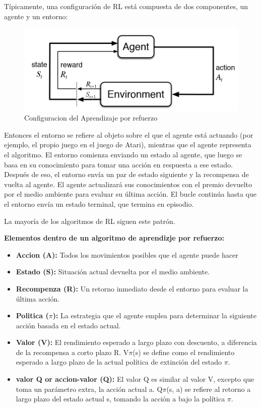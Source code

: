 Típicamente, una configuración de RL está compuesta de dos componentes, un agente y un entorno:

\begin{figure}[ht]
	\centering
	\includegraphics[width=0.30\linewidth]{figuras/reinforcementLearning.png}
	\caption{Configuracion del Aprendizaje por refuerzo}
	\label{ASS}
\end{figure}


Entonces el entorno se refiere al objeto sobre el que el agente está actuando (por ejemplo, el propio juego en el juego de Atari), mientras que el agente representa el algoritmo. El entorno comienza enviando un estado al agente, que luego se basa en su conocimiento para tomar una acción en respuesta a ese estado. Después de eso, el entorno envía un par de estado siguiente y la recompensa de vuelta al agente. El agente actualizará sus conocimientos con el premio devuelto por el medio ambiente para evaluar su última acción. El bucle continúa hasta que el entorno envía un estado terminal, que termina en episodio.

La mayoría de los algoritmos de RL siguen este patrón.

\textbf{Elementos dentro de un algoritmo de aprendizje por refuerzo: }

 \begin{itemize}
  
  \item{ } \textbf{Accion (A): } Todos los movimientos posibles que el agente puede hacer

  \item{ } \textbf{Estado (S): } Situación actual devuelta por el medio ambiente.
	 
  \item{ } \textbf{Recompenza (R): } Un retorno inmediato desde el entorno para evaluar la última acción. 
  		
  \item{ } \textbf{Politica ($\pi$): }  La estrategia que el agente emplea para determinar la siguiente acción basada en el estado actual.
  
  \item{ } \textbf{Valor (V): }  El rendimiento esperado a largo plazo con descuento, a diferencia de la recompensa a corto plazo R. V$\pi$(s) se define como el rendimiento esperado a largo plazo de la actual política de extinción del estado $\pi$.
  
  \item{ } \textbf{valor Q or accion-valor (Q): }   El valor Q es similar al valor V, excepto que toma un parámetro extra, la acción actual a. Q$\pi$(s, a) se refiere al retorno a largo plazo del estado actual s, tomando la acción a bajo la política $\pi$.
  
  \end{itemize}
  
